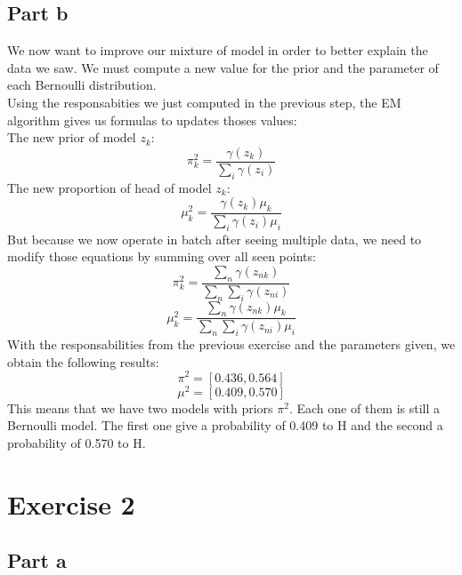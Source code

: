 \documentclass[a4paper, 10pt]{article}
\begin{document}
\subsection{Part b}
We now want to improve our mixture of model in order to better explain the data we saw.
We must compute a new value for the prior and the parameter of each Bernoulli distribution.
\\
Using the responsabities we just computed in the previous step, the EM algorithm gives us 
formulas to updates thoses values:
\\
The new prior of model $z_k$:
$$
\pi^2_k = \frac{\gamma(z_k)}{\sum_i \gamma(z_i)}
$$
The new proportion of head of model $z_k$:
$$
\mu^2_k = \frac{\gamma(z_k)\mu_k}{\sum_i \gamma(z_i)\mu_i}
$$
But because we now operate in batch after seeing multiple data, we need to modify
those equations by summing over all seen points:
$$
\pi^2_k = \frac{\sum_n\gamma(z_{nk})}{\sum_n \sum_i \gamma(z_{ni})}
$$
$$
\mu^2_k = \frac{\sum_n \gamma(z_{nk})\mu_k}{\sum_n \sum_i \gamma(z_{ni})\mu_i}
$$
With the responsabilities from the previous exercise and the parameters given,
we obtain the following results:
$$
\pi^2 = \left[0.436, 0.564\right]
$$
$$
\mu^2 = \left[0.409, 0.570\right]
$$
This means that we have two models with priors $\pi^2$. Each one of them is still a
Bernoulli model. The first one give a probability of 0.409 to H and the second a probability
of 0.570 to H.

\section{Exercise 2}
\subsection{Part a}
\end{document}
